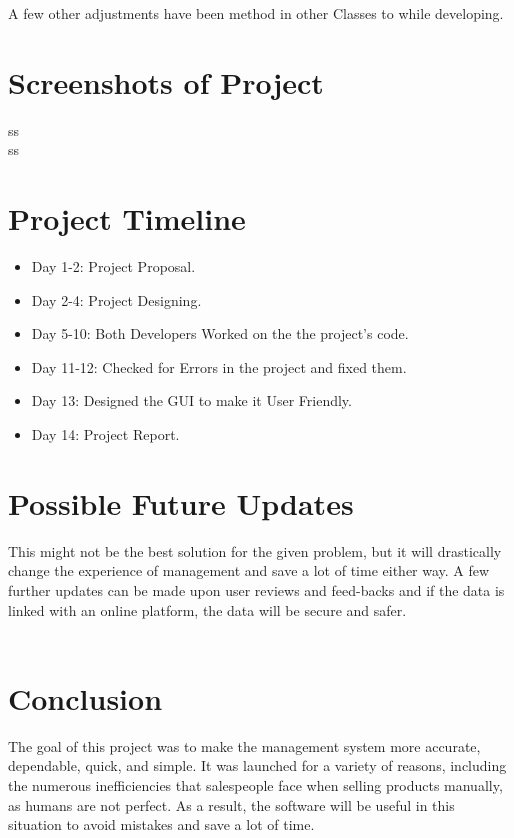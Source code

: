 \documentclass{article}
\begin{document}
A few other adjustments have been method in other Classes to while developing.

\pagebreak

{}
\section*{\LARGE Screenshots of Project}

\pagebreak
ss\\ \newpage
ss
\pagebreak
{}
{}
\section*{\LARGE Project Timeline}
\large 
\begin{itemize}
    \item \large Day 1-2: Project Proposal.
    \item \large Day 2-4: Project Designing.
    \item \large Day 5-10: Both Developers Worked on the the project's code.
    \item \large Day 11-12: Checked for Errors in the project and fixed them.
    \item \large Day 13: Designed the GUI to make it User Friendly.
    \item \large Day 14: Project Report.
\end{itemize}

{}
\section*{\LARGE Possible Future Updates}
This might not be the best solution for the given problem, but it will drastically change the experience of management and save a lot of time either way. A few further updates can be made upon user reviews and feed-backs and if the data is linked with an online platform, the data will be secure and safer.
\\
\\

{}
\section*{\LARGE Conclusion}
The goal of this project was to make the management system more accurate, dependable, quick, and simple. It was launched for a variety of reasons, including the numerous inefficiencies that salespeople face when selling products manually, as humans are not perfect. As a result, the software will be useful in this situation to avoid mistakes and save a lot of time.
\end{document}
